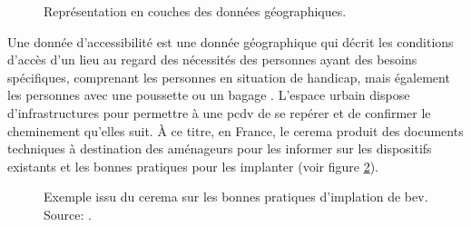 \begin{figure}[ht]
    \centering
    \caption[Représentation en couche des données géographiques]{Représentation en couches des données géographiques.}
    \label{fig:geodatalayers}
\end{figure}

\newpar{}


Une donnée d'accessibilité est une donnée géographique qui décrit les conditions d'accès d'un lieu au regard des nécessités des personnes ayant des besoins spécifiques, comprenant les personnes en situation de handicap, mais également les personnes avec une poussette ou un bagage \citep{Ding2014}. L'espace urbain dispose d'infrastructures pour permettre à une \gls{pcdv} de se repérer et de confirmer le cheminement qu'elles suit. À ce titre, en France, le \gls{cerema} produit des documents techniques à destination des aménageurs pour les informer sur les dispositifs existants et les bonnes pratiques pour les implanter (voir figure \ref{fig:ea_exemple_cerema_bev}).

\begin{figure}[ht]
    \centering
    \caption[Bonnes pratiques d'implantation des pavages tactiles]{Exemple issu du \gls{cerema} sur les bonnes pratiques d'implation de \gls{bev}. Source: \citep{CEREMA2022}.}
    \label{fig:ea_exemple_cerema_bev}
\end{figure}

